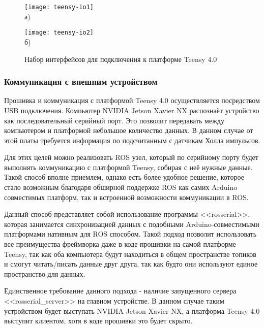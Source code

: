 \begin{figure}[ht]
    \begin{minipage}[b][][b]{0.49\linewidth}\centering
        \texttt{[image: teensy-io1]} \\ а)
    \end{minipage}
    \hfill
    \begin{minipage}[b][][b]{0.49\linewidth}\centering
        \texttt{[image: teensy-io2]} \\ б)
    \end{minipage}
    \caption{Набор интерфейсов для подключения к платформе Teensy 4.0}
    \label{fig:teensy-io}
\end{figure}

\subsubsection{Коммуникация с внешним устройством}
Прошивка и коммуникация с платформой Teensy 4.0 осуществляется посредством USB подключения. Компьютер NVIDIA Jetson Xavier NX распознаёт устройство как последовательный серийный порт. Это позволит передавать между компьютером и платформой небольшое количество данных. В данном случае от этой платы требуется информация по подсчитанным с датчикам Холла импульсов. 

Для этих целей можно реализовать ROS узел, который по серийному порту будет выполнять коммуникацию с платформой Teensy, собирая с неё нужные данные. Такой способ вполне приемлем, однако есть более удобное решение, которое стало возможным благодаря обширной поддержке ROS как самих Arduino совместимых платформ, так и встроенной возможности коммуникации в ROS. 

Данный способ представляет собой использование программы <<rosserial>>, которая занимается синхронизацией данных с подобными Arduino-совместимыми платформами нативным для ROS способом. Такой подход позволит использовать все преимущества фреймворка даже в коде прошивки на самой платформе Teensy, так как оба компьютера будут находиться в общем пространстве топиков и смогут читать/писать данные друг друга, так как будто они используют единое пространство для данных.

Единственное требование данного подхода - наличие запущенного сервера <<rosserial\_server>> на главном устройстве. В данном случае таким устройством будет выступать NVIDIA Jetson Xavier NX, а платформа Teensy 4.0 выступит клиентом, хотя в коде прошивки это будет скрыто.


